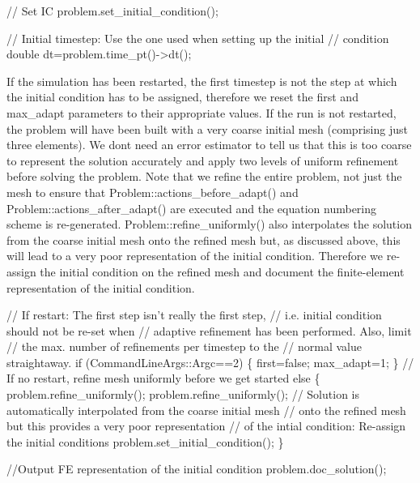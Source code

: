 \begin{DoxyCodeInclude}
 \textcolor{comment}{// Set IC}
 problem.set\_initial\_condition();

 \textcolor{comment}{// Initial timestep: Use the one used when setting up the initial}
 \textcolor{comment}{// condition}
 \textcolor{keywordtype}{double} dt=problem.time\_pt()->dt();

\end{DoxyCodeInclude}


If the simulation has been restarted, the first timestep is not the step at which the initial condition has to be assigned, therefore we reset the {\ttfamily first} and {\ttfamily max\+\_\+adapt} parameters to their appropriate values. If the run is not restarted, the problem will have been built with a very coarse initial mesh (comprising just three elements). We don\textquotesingle{}t need an error estimator to tell us that this is too coarse to represent the solution accurately and apply two levels of uniform refinement before solving the problem. Note that we refine the entire problem, not just the mesh to ensure that {\ttfamily Problem\+::actions\+\_\+before\+\_\+adapt()} and {\ttfamily Problem\+::actions\+\_\+after\+\_\+adapt()} are executed and the equation numbering scheme is re-\/generated. {\ttfamily Problem\+::refine\+\_\+uniformly()} also interpolates the solution from the coarse initial mesh onto the refined mesh but, as discussed above, this will lead to a very poor representation of the initial condition. Therefore we re-\/assign the initial condition on the refined mesh and document the finite-\/element representation of the initial condition.


\begin{DoxyCodeInclude}
 \textcolor{comment}{// If restart: The first step isn't really the first step,}
 \textcolor{comment}{// i.e. initial condition should not be re-set when }
 \textcolor{comment}{// adaptive refinement has been performed. Also, limit}
 \textcolor{comment}{// the max. number of refinements per timestep to the}
 \textcolor{comment}{// normal value straightaway.}
 \textcolor{keywordflow}{if} (CommandLineArgs::Argc==2)
  \{
   first=\textcolor{keyword}{false};
   max\_adapt=1;
  \}
 \textcolor{comment}{// If no restart, refine mesh uniformly before we get started}
 \textcolor{keywordflow}{else}
  \{
   problem.refine\_uniformly();
   problem.refine\_uniformly();
   \textcolor{comment}{// Solution is automatically interpolated from the coarse initial mesh}
   \textcolor{comment}{// onto the refined mesh but this provides a very poor representation}
   \textcolor{comment}{// of the intial condition: Re-assign the initial conditions}
   problem.set\_initial\_condition();
  \}

 \textcolor{comment}{//Output FE representation of the initial condition}
 problem.doc\_solution();

\end{DoxyCodeInclude}


